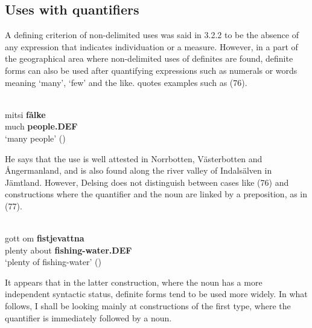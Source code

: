 
\subsection{ Uses with quantifiers}
\label{bkm:Ref114303795}
A defining criterion of non-delimited uses was said in 3.2.2 to be the absence of any expression that indicates individuation or a measure. However, in a part of the geographical area where non-delimited uses of definites are found, definite forms can also be used after quantifying expressions such as numerals or words meaning ‘many’, ‘few’ and the like. \citet{Delsing2003a} quotes examples such as (76).


\ea \label{} 
\\
\gll mitsi  \textbf{fålke}\\
much  \textbf{people.DEF}\\
\glt ‘many people’ (\citet[17]{Delsing2003a})

\z

He says that the use is well attested in Norrbotten, Västerbotten and Ångermanland, and is also found along the river valley of Indalsälven in Jämtland. However, Delsing does not distinguish between cases like (76) and constructions where the quantifier and the noun are linked by a preposition, as in (77).


\ea \label{} 
\\
\gll gott  om  \textbf{fistjevattna} \\
plenty  about  \textbf{fishing-water.DEF} \\
\glt ‘plenty of fishing-water’ (\citet[18]{Delsing2003a})

\z

It appears that in the latter construction, where the noun has a more independent syntactic status, definite forms tend to be used more widely. In what follows, I shall be looking mainly at constructions of the first type, where the quantifier is immediately followed by a noun. 

